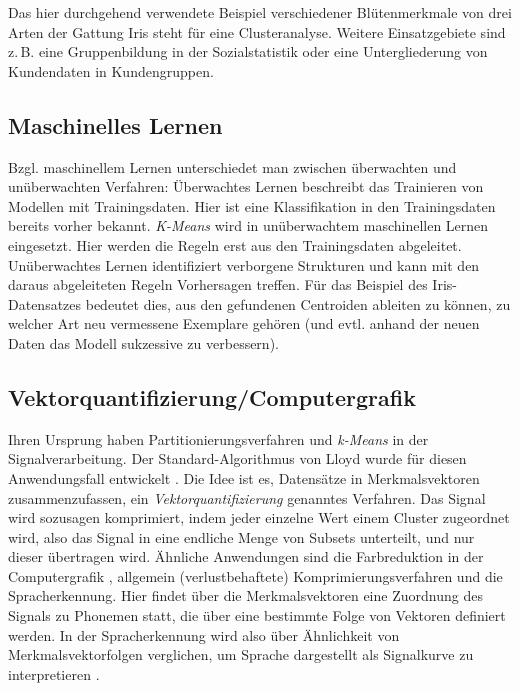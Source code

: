 \documentclass[a4paper,12pt,twoside]{article}
\newcommand{\Fachbegriff}[1]{\textit{#1}}
\begin{document}
Das hier durchgehend verwendete Beispiel verschiedener Blütenmerkmale von drei Arten der Gattung Iris steht für eine Clusteranalyse. Weitere Einsatzgebiete sind z.\,B. eine Gruppenbildung in der Sozialstatistik oder eine Untergliederung von Kundendaten in Kundengruppen.

\subsection{Maschinelles Lernen}
Bzgl. maschinellem Lernen unterschiedet man zwischen überwachten und unüberwachten Verfahren: Überwachtes Lernen beschreibt das Trainieren von Modellen mit Trainingsdaten. Hier ist eine Klassifikation in den Trainingsdaten bereits vorher bekannt.
\Fachbegriff{K-Means} wird in unüberwachtem maschinellen Lernen eingesetzt. Hier werden die Regeln erst aus den Trainingsdaten abgeleitet. Unüberwachtes Lernen identifiziert verborgene Strukturen und kann mit den daraus abgeleiteten Regeln Vorhersagen treffen. Für das Beispiel des Iris-Datensatzes bedeutet dies, aus den gefundenen Centroiden ableiten zu können, zu welcher Art neu vermessene Exemplare gehören (und evtl. anhand der neuen Daten das Modell sukzessive zu verbessern). \autocite[vergl.][460ff]{Coates.2012, DavidMacKay.2003, Hastie.2001}

\subsection{Vektorquantifizierung/Computergrafik}
Ihren Ursprung haben Partitionierungsverfahren und \Fachbegriff{k-Means} in der Signalverarbeitung. Der Standard-Algorithmus von Lloyd wurde für diesen Anwendungsfall entwickelt \autocite{Lloyd..1982}. Die Idee ist es, Datensätze in Merkmalsvektoren zusammenzufassen, ein \Fachbegriff{Vektorquantifizierung} genanntes Verfahren. Das Signal wird sozusagen komprimiert, indem jeder einzelne Wert einem Cluster zugeordnet wird, also das Signal in eine endliche Menge von Subsets unterteilt, und nur dieser übertragen wird.
Ähnliche Anwendungen sind die Farbreduktion in der Computergrafik \autocite{Mikolov.2007}, allgemein (verlustbehaftete) Komprimierungsverfahren und die Spracherkennung. Hier findet über die Merkmalsvektoren eine Zuordnung des Signals zu Phonemen statt, die über eine bestimmte Folge von Vektoren definiert werden. In der Spracherkennung wird also über Ähnlichkeit von Merkmalsvektorfolgen verglichen, um Sprache dargestellt als Signalkurve zu interpretieren \autocite[][10f]{Jelinek.2001}.
\end{document}
